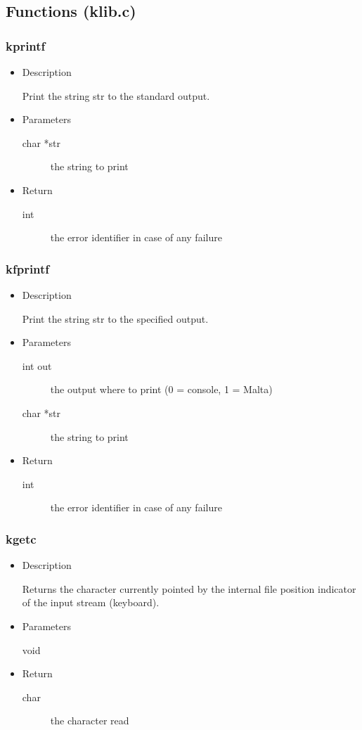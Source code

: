 \subsection{Functions (klib.c)}

\subsubsection{kprintf}
\begin{itemize}
\item{Description}

	Print the string str to the standard output.
\item{Parameters}
	\begin{description}
	\item[char *str] the string to print
	\end{description}
\item{Return}
	\begin{description}
	\item[int] the error identifier in case of any failure
	\end{description}
\end{itemize}

\subsubsection{kfprintf}
\begin{itemize}
\item{Description}

	Print the string str to the specified output.
\item{Parameters}
	\begin{description}
	\item[int out] the output where to print (0 = console, 1 = Malta)
	\item[char *str] the string to print
	\end{description}
\item{Return}
	\begin{description}
	\item[int] the error identifier in case of any failure
	\end{description}
\end{itemize}

\subsubsection{kgetc}
\begin{itemize}
\item{Description}

	Returns the character currently pointed by the internal file position indicator of the input stream (keyboard).
\item{Parameters}
	\begin{description}
	\item[void] 
	\end{description}
\item{Return}
	\begin{description}
	\item[char] the character read
	\end{description}
\end{itemize}

